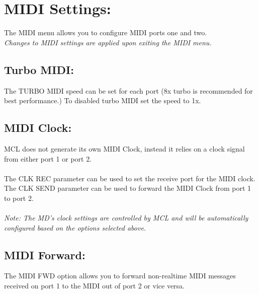 \chapter{MIDI Settings:}
The MIDI menu allows you to configure MIDI ports one and two.
\\
\textit{Changes to MIDI settings are applied upon exiting the MIDI menu.}

\section{Turbo MIDI:}
The TURBO MIDI speed can be set for each port (8x turbo is recommended for best performance.) To disabled turbo MIDI set the speed to 1x.
\section{MIDI Clock:}
MCL does not generate its own MIDI Clock, instead it relies on a clock signal from either port 1 or port 2.\\\\
The CLK REC parameter can be used to set the receive port for the MIDI clock.\\
The CLK SEND parameter can be used to forward the MIDI Clock from port 1 to port 2.\\\\
\textit{Note: The MD's clock settings are controlled by MCL and will be automatically configured based on the options selected above.}

\section{MIDI Forward:}
The MIDI FWD option allows you to forward non-realtime MIDI messages received on port 1 to the MIDI out of port 2 or vice versa.
